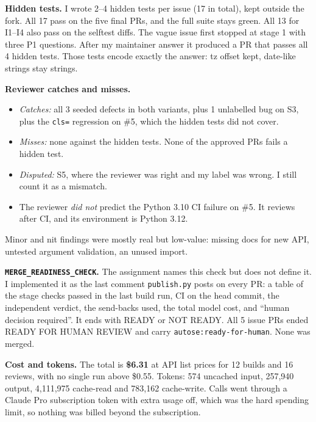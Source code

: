 \documentclass[11pt,a4paper]{article}
\begin{document}
\textbf{Hidden tests.} I wrote 2--4 hidden tests per issue (17 in total), kept outside the fork. All
17 pass on the five final PRs, and the full suite stays green. All 13 for I1--I4 also pass on the
selftest diffs. The vague issue first stopped at stage 1 with three P1 questions. After my
maintainer answer it produced a PR that passes all 4 hidden tests. Those tests encode exactly the
answer: tz offset kept, date-like strings stay strings.

\textbf{Reviewer catches and misses.}
\begin{itemize}
\item \emph{Catches:} all 3 seeded defects in both variants, plus 1 unlabelled bug on S3, plus the
\texttt{cls=} regression on \#5, which the hidden tests did not cover.
\item \emph{Misses:} none against the hidden tests. None of the approved PRs fails a hidden test.
\item \emph{Disputed:} S5, where the reviewer was right and my label was wrong. I still count it as a
mismatch.
\item The reviewer \emph{did not} predict the Python 3.10 CI failure on \#5. It reviews after CI,
and its environment is Python 3.12.
\end{itemize}
Minor and nit findings were mostly real but low-value: missing docs for new API, untested
argument validation, an unused import.

\textbf{\texttt{MERGE\_READINESS\_CHECK}.} The assignment names this check but does not define it. I
implemented it as the last comment \texttt{publish.py} posts on every PR: a table of the stage checks
passed in the last build run, CI on the head commit, the independent verdict, the send-backs used,
the total model cost, and ``human decision required''. It ends with READY or NOT READY. All 5 issue
PRs ended READY FOR HUMAN REVIEW and carry \texttt{autose:ready-for-human}. None was merged.

\textbf{Cost and tokens.} The total is \textbf{\$6.31} at API list prices for 12 builds and 16
reviews, with no single run above \$0.55. Tokens: 574 uncached input, 257,940 output, 4,111,975
cache-read and 783,162 cache-write. Calls went through a Claude Pro subscription token with extra
usage off, which was the hard spending limit, so nothing was billed beyond the subscription.
\end{document}
